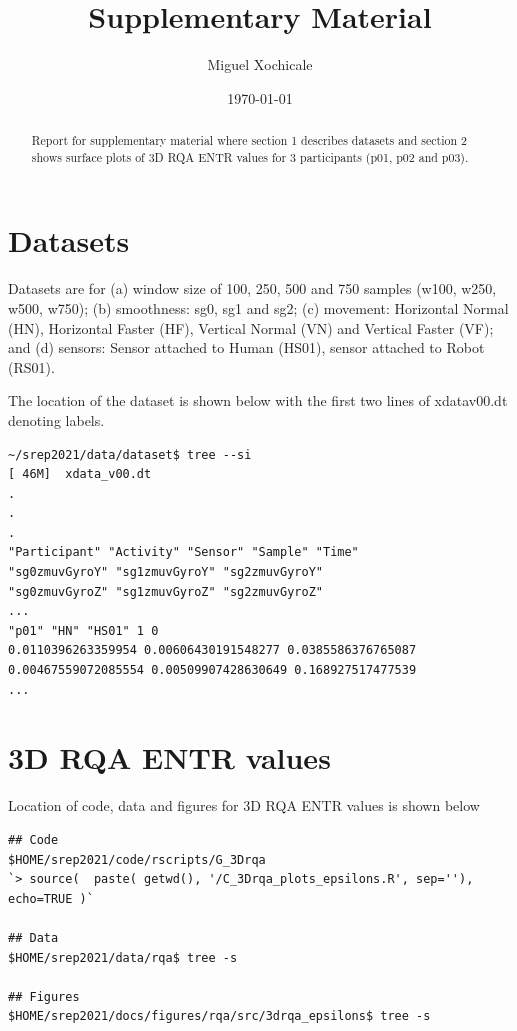 \documentclass[12pt]{article}
\title{
Supplementary Material
}
\author{Miguel Xochicale}
\date{ \today }
\begin{document}
\maketitle

\begin{abstract}
Report for supplementary material where section 1 describes datasets and section 2 shows surface plots of 3D RQA ENTR values for 3 participants (p01, p02 and p03).
\end{abstract}

\tableofcontents


\section{Datasets}
Datasets are for 
(a) window size of 100, 250, 500 and 750 samples (w100, w250, w500, w750);
(b) smoothness: sg0, sg1 and sg2;
(c) movement: Horizontal Normal (HN), Horizontal Faster (HF), Vertical Normal (VN) and Vertical Faster (VF); and 
(d) sensors: Sensor attached to Human (HS01), sensor attached to Robot (RS01).

The location of the dataset is shown below with the first two lines of xdatav00.dt denoting labels.
\begin{verbatim}
~/srep2021/data/dataset$ tree --si
[ 46M]  xdata_v00.dt
.
.
.
"Participant" "Activity" "Sensor" "Sample" "Time" 
"sg0zmuvGyroY" "sg1zmuvGyroY" "sg2zmuvGyroY" 
"sg0zmuvGyroZ" "sg1zmuvGyroZ" "sg2zmuvGyroZ"
...
"p01" "HN" "HS01" 1 0 
0.0110396263359954 0.00606430191548277 0.0385586376765087 
0.00467559072085554 0.00509907428630649 0.168927517477539
...
\end{verbatim}


\section{3D RQA ENTR values}
Location of code, data and figures for 3D RQA ENTR values is shown below 
\begin{verbatim}
## Code
$HOME/srep2021/code/rscripts/G_3Drqa
`> source(  paste( getwd(), '/C_3Drqa_plots_epsilons.R', sep=''), echo=TRUE )`

## Data
$HOME/srep2021/data/rqa$ tree -s 

## Figures
$HOME/srep2021/docs/figures/rqa/src/3drqa_epsilons$ tree -s
\end{verbatim}
\end{document}
